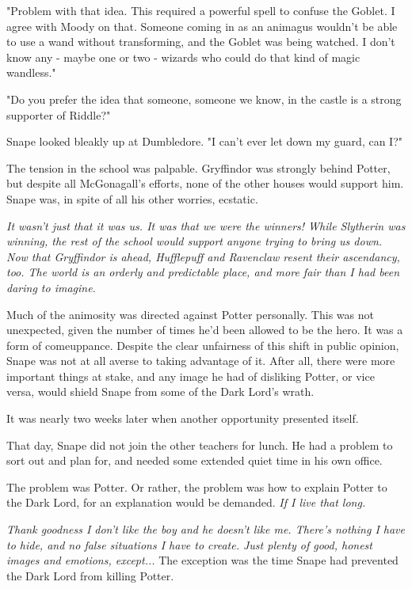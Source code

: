 "Problem with that idea. This required a powerful spell to confuse the Goblet. I agree with Moody on that. Someone coming in as an animagus wouldn't be able to use a wand without transforming, and the Goblet was being watched. I don't know any - maybe one or two - wizards who could do that kind of magic wandless."

"Do you prefer the idea that someone, someone we know, in the castle is a strong supporter of Riddle?"

Snape looked bleakly up at Dumbledore. "I can't ever let down my guard, can I?"

The tension in the school was palpable. Gryffindor was strongly behind Potter, but despite all McGonagall's efforts, none of the other houses would support him. Snape was, in spite of all his other worries, ecstatic.

\emph{It wasn't just that it was us. It was that we were the winners! While Slytherin was winning, the rest of the school would support anyone trying to bring us down. Now that Gryffindor is ahead, Hufflepuff and Ravenclaw resent their ascendancy, too. The world is an orderly and predictable place, and more fair than I had been daring to imagine.}

Much of the animosity was directed against Potter personally. This was not unexpected, given the number of times he'd been allowed to be the hero. It was a form of comeuppance. Despite the clear unfairness of this shift in public opinion, Snape was not at all averse to taking advantage of it. After all, there were more important things at stake, and any image he had of disliking Potter, or vice versa, would shield Snape from some of the Dark Lord's wrath.

It was nearly two weeks later when another opportunity presented itself.

That day, Snape did not join the other teachers for lunch. He had a problem to sort out and plan for, and needed some extended quiet time in his own office.

The problem was Potter. Or rather, the problem was how to explain Potter to the Dark Lord, for an explanation would be demanded. \emph{If I live that long.}

\emph{Thank goodness I don't like the boy and he doesn't like me. There's nothing I have to hide, and no false situations I have to create. Just plenty of good, honest images and emotions, except...} The exception was the time Snape had prevented the Dark Lord from killing Potter.

